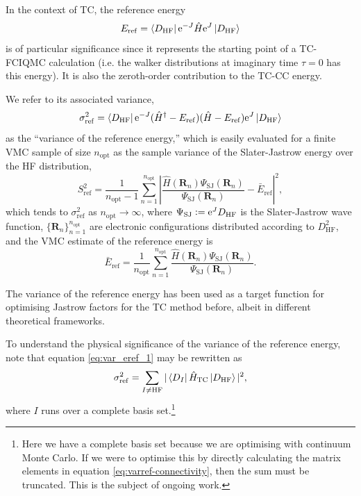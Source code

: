 In the context of TC, the reference energy
\begin{equation}
    E_\mathrm{ref} = \bra{D_\mathrm{HF}}\mathrm{e}^{-J}\hat H\mathrm{e}^J\ket{D_\mathrm{HF}}
\end{equation}
is of particular significance since it represents the starting point of a TC-FCIQMC calculation (i.e. the walker distributions at imaginary time $\tau=0$ has this energy). It is also the zeroth-order contribution to the TC-\gls{CC} energy.

We refer to its associated variance,
\begin{equation}
  \label{eq:var_eref_1}
  \sigma_\mathrm{ref}^2 =
    \bra{D_\mathrm{HF}}\mathrm{e}^{-J} (\hat H^\dag-E_\mathrm{ref})(\hat H-E_\mathrm{ref}) \mathrm{e}^J\ket{D_\mathrm{HF}}
\end{equation}
as the ``variance of the reference energy,'' which is easily evaluated for a finite VMC sample of size $n_\mathrm{opt}$ as the sample variance of the Slater-Jastrow energy over the HF distribution,
\begin{equation}
    S_\mathrm{ref}^2 =
      \frac 1 {n_\mathrm{opt}-1}
      \sum_{n=1}^{n_\mathrm{opt}}
        \left| \frac {\hat H({\bm R}_n) \Psi_\mathrm{SJ}({\bm R}_n)}
                     {\Psi_\mathrm{SJ}({\bm R}_n)} - {\bar E}_\mathrm{ref}
        \right|^2,
\end{equation}
which tends to $\sigma_\mathrm{ref}^2$ as $n_\mathrm{opt}\to\infty$, where $\Psi_\mathrm{SJ}\mathrel{\mathop:}= \mathrm{e}^JD_\mathrm{HF}$ is the Slater-Jastrow wave function, $\{{\bm R}_n\}_{n=1}^{n_\mathrm{opt}}$ are electronic
configurations distributed according to $D_\mathrm{HF}^2$, and the VMC
estimate of the reference energy is
\begin{equation}
    {\bar E}_\mathrm{ref} =
      \frac 1 {n_\mathrm{opt}}
      \sum_{n=1}^{n_\mathrm{opt}}
        \frac {\hat H({\bm R}_n) \Psi_\mathrm{SJ}({\bm R}_n)}
              {\Psi_\mathrm{SJ}({\bm R}_n)}.
\end{equation}

The variance of the reference energy has been used as a target function for optimising Jastrow factors for the TC method before, albeit in different theoretical frameworks.\supercite{handyMinimization1971,umezawaTranscorrelated2003}

To understand the physical significance of the variance of the reference energy, note that equation \ref{eq:var_eref_1} may be rewritten as
\begin{equation}
    \label{eq:varref-connectivity}
    \sigma_\mathrm{ref}^2 = \sum_{I\neq \mathrm{HF}}|\bra{D_I}\hat H_\mathrm{TC}\ket{D_\mathrm{HF}}|^2,
\end{equation}
where $I$ runs over a complete basis set.\footnote{Here we have a complete basis set because we are optimising with continuum Monte Carlo. If we were to optimise this by directly calculating the matrix elements in equation \ref{eq:varref-connectivity}, then the sum must be truncated. This is the subject of ongoing work.}

